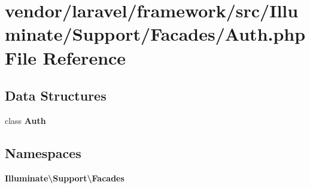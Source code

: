 \section{vendor/laravel/framework/src/\+Illuminate/\+Support/\+Facades/\+Auth.php File Reference}
\label{vendor_2laravel_2framework_2src_2_illuminate_2_support_2_facades_2auth_8php}
\subsection*{Data Structures}
\begin{DoxyCompactItemize}
\item 
class {\bf Auth}
\end{DoxyCompactItemize}
\subsection*{Namespaces}
\begin{DoxyCompactItemize}
\item 
 {\bf Illuminate\textbackslash{}\+Support\textbackslash{}\+Facades}
\end{DoxyCompactItemize}
